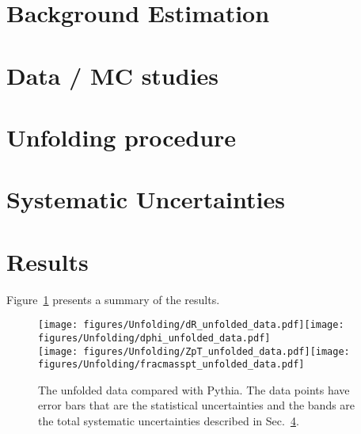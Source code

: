 \documentclass[UKenglish,texlive=2013]{\ATLASLATEXPATH atlasdoc}
\begin{document}
\clearpage

\section{Background Estimation}
\label{sec:backgrounds}


\clearpage

\section{Data / MC studies}
\label{sec:datamc}


\clearpage

\section{Unfolding procedure}
\label{sec:unfold}


\clearpage

\section{Systematic Uncertainties}
\label{sec:systs}


\clearpage

\section{Results}
\label{sec:results}

Figure~\ref{fig:results} presents a summary of the results.

\begin{figure}[htpb!]
\begin{center}
\texttt{[image: figures/Unfolding/dR\_unfolded\_data.pdf]}\texttt{[image: figures/Unfolding/dphi\_unfolded\_data.pdf]}\\
\texttt{[image: figures/Unfolding/ZpT\_unfolded\_data.pdf]}\texttt{[image: figures/Unfolding/fracmasspt\_unfolded\_data.pdf]}
\caption[]{The unfolded data compared with Pythia. The data points have error bars that are the statistical uncertainties and the bands are the total systematic uncertainties described in Sec.~\ref{sec:systs}.} 
\label{fig:results}
\end{center}
\end{figure}
\end{document}
